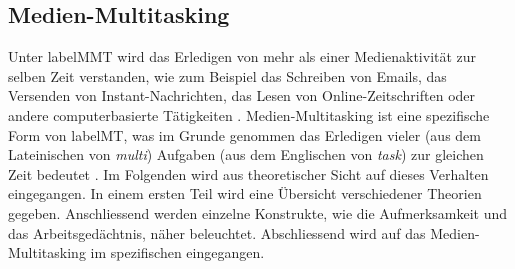 \subsection{Medien-Multitasking}\label{subsection.medienMultitasking}
Unter \gls{labelMMT} wird das Erledigen von mehr als einer Medienaktivität zur selben Zeit verstanden, wie zum Beispiel das Schreiben von Emails, das Versenden von Instant-Nachrichten, das Lesen von Online-Zeitschriften oder andere computerbasierte Tätigkeiten \cite{Foehr2006}. Medien-Multitasking ist eine spezifische Form von \gls{labelMT}, was im Grunde genommen das Erledigen vieler (aus dem Lateinischen von \textit{multi}) Aufgaben (aus dem Englischen von \textit{task}) zur gleichen Zeit bedeutet \cite{Spitzer2012}.  Im Folgenden wird aus theoretischer Sicht auf dieses Verhalten eingegangen. In einem ersten Teil wird eine Übersicht verschiedener Theorien gegeben. Anschliessend werden einzelne Konstrukte, wie die Aufmerksamkeit und das Arbeitsgedächtnis, näher beleuchtet. Abschliessend wird auf das Medien-Multitasking im spezifischen eingegangen.
\par
